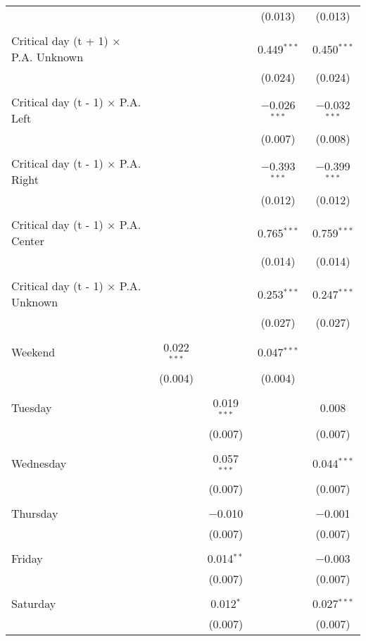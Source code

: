 \documentclass[
]{article}
\begin{document}
\begin{table}[!htbp]
{\begin{tabular}{@{\extracolsep{5pt}}lcccc}
  &  &  & (0.013) & (0.013) \\ 
  & & & & \\ 
 Critical day (t + 1) $\times$ P.A. Unknown &  &  & 0.449$^{***}$ & 0.450$^{***}$ \\ 
  &  &  & (0.024) & (0.024) \\ 
  & & & & \\ 
 Critical day (t - 1) $\times$ P.A. Left &  &  & $-$0.026$^{***}$ & $-$0.032$^{***}$ \\ 
  &  &  & (0.007) & (0.008) \\ 
  & & & & \\ 
 Critical day (t - 1) $\times$ P.A. Right &  &  & $-$0.393$^{***}$ & $-$0.399$^{***}$ \\ 
  &  &  & (0.012) & (0.012) \\ 
  & & & & \\ 
 Critical day (t - 1) $\times$ P.A. Center &  &  & 0.765$^{***}$ & 0.759$^{***}$ \\ 
  &  &  & (0.014) & (0.014) \\ 
  & & & & \\ 
 Critical day (t - 1) $\times$ P.A. Unknown &  &  & 0.253$^{***}$ & 0.247$^{***}$ \\ 
  &  &  & (0.027) & (0.027) \\ 
  & & & & \\ 
 Weekend & 0.022$^{***}$ &  & 0.047$^{***}$ &  \\ 
  & (0.004) &  & (0.004) &  \\ 
  & & & & \\ 
 Tuesday &  & 0.019$^{***}$ &  & 0.008 \\ 
  &  & (0.007) &  & (0.007) \\ 
  & & & & \\ 
 Wednesday &  & 0.057$^{***}$ &  & 0.044$^{***}$ \\ 
  &  & (0.007) &  & (0.007) \\ 
  & & & & \\ 
 Thursday &  & $-$0.010 &  & $-$0.001 \\ 
  &  & (0.007) &  & (0.007) \\ 
  & & & & \\ 
 Friday &  & 0.014$^{**}$ &  & $-$0.003 \\ 
  &  & (0.007) &  & (0.007) \\ 
  & & & & \\ 
 Saturday &  & 0.012$^{*}$ &  & 0.027$^{***}$ \\ 
  &  & (0.007) &  & (0.007) \\ 

\end{tabular}}
\end{table}
\end{document}
